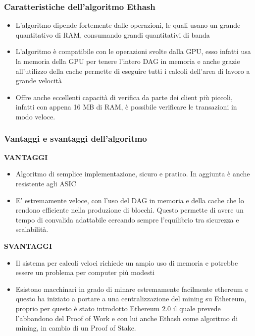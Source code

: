 \documentclass[a4paper,11pt]{report}
\begin{document}
\subsubsection{Caratteristiche dell'algoritmo Ethash}
\begin{itemize}
\item L'algoritmo dipende fortemente dalle operazioni, le quali usano un grande quantitativo di RAM, consumando grandi quantitativi di banda
\item L'algoritmo è compatibile con le operazioni svolte dalla GPU, esso infatti usa la memoria della GPU per tenere l'intero DAG in memoria e anche grazie all'utilizzo della cache permette di eseguire tutti i calcoli dell'area di lavoro a grande velocità
\item Offre anche eccellenti capacità di verifica da parte dei client più piccoli, infatti con appena 16 MB di RAM, è possibile verificare le transazioni in modo veloce.
\end{itemize}

\subsubsection{Vantaggi e svantaggi dell'algoritmo}
\textbf{VANTAGGI}\\
\begin{itemize}
\item Algoritmo di semplice implementazione, sicuro e pratico. In aggiunta è anche resistente agli ASIC
\item E' estremamente veloce, con l'uso del DAG in memoria e della cache che lo rendono efficiente nella produzione di blocchi. Questo permette di avere un tempo di convalida adattabile cercando sempre l'equilibrio tra sicurezza e scalabilità.
\end{itemize}
\textbf{SVANTAGGI}\\
\begin{itemize}
\item Il sistema per calcoli veloci richiede un ampio uso di memoria e potrebbe essere un problema per computer più modesti
\item Esistono macchinari in grado di minare estremamente facilmente ethereum e questo ha iniziato a portare a una centralizzazione del mining su Ethereum, proprio per questo è stato introdotto Ethereum 2.0 il quale prevede l'abbandono del Proof of Work e con lui anche Ethash come algoritmo di mining, in cambio di un Proof of Stake.  
\end{itemize}
\end{document}
